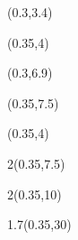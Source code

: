 \begin{textblock*}{\paperwidth}(0.3\TPHorizModule,3.4\TPVertModule)
  \fbox{\textcolor{white}{\rule{2.27\TPHorizModule}{2.9\TPVertModule}}}
\end{textblock*}
\begin{textblock*}{\paperwidth}(0.35\TPHorizModule,4\TPVertModule)
  \titlefmt
\end{textblock*}

\begin{textblock*}{\paperwidth}(0.3\TPHorizModule,6.9\TPVertModule)
  \fbox{\textcolor{white}{\rule{0.97\TPHorizModule}{2.0\TPVertModule}}}
\end{textblock*}
\begin{textblock*}{\paperwidth}(0.35\TPHorizModule,7.5\TPVertModule)
  \authorfmt
\end{textblock*}

\null\cleardoublepage


\begin{textblock*}{\paperwidth}(0.35\TPHorizModule,4\TPVertModule)
  \titlefmt
\end{textblock*}

\begin{textblock*}{2\TPHorizModule}(0.35\TPHorizModule,7.5\TPVertModule)
  \authorfmt
\end{textblock*}

\begin{textblock*}{2\TPHorizModule}(0.35\TPHorizModule,10\TPVertModule)
  \affiliation
\end{textblock*}

\begin{textblock*}{1.7\TPHorizModule}(0.35\TPHorizModule,30\TPVertModule)
  \edition
\end{textblock*}
\endgroup

